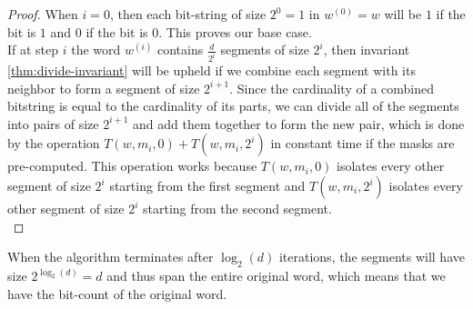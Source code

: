 \begin{proof}
    When $i=0$, then each bit-string of size $2^0=1$ in $w^{(0)} = w$ will be $1$ if the bit is $1$ and $0$ if the bit is $0$. This proves our base case. \\
    If at step $i$ the word $w^{(i)}$ contains $\frac{d}{2^i}$ segments of size $2^i$, then invariant \ref{thm:divide-invariant} will be upheld if we combine each segment with its neighbor to form a segment of size $2^{i+1}$. Since the cardinality of a combined bitstring is equal to the cardinality of its parts, we can divide all of the segments into pairs of size $2^{i+1}$ and add them together to form the new pair, which is done by the operation $T(w, m_i, 0) + T(w, m_i, 2^i)$ in constant time if the masks are pre-computed. This operation works because $T(w, m_i, 0)$ isolates every other segment of size $2^i$ starting from the first segment and $T(w, m_i, 2^i)$ isolates every other segment of size $2^i$ starting from the second segment.\\
\end{proof}
When the algorithm terminates after $\log_2(d)$ iterations, the segments will have size $2^{\log_2{(d)}} = d$ and thus span the entire original word, which means that we have the bit-count of the original word. %
